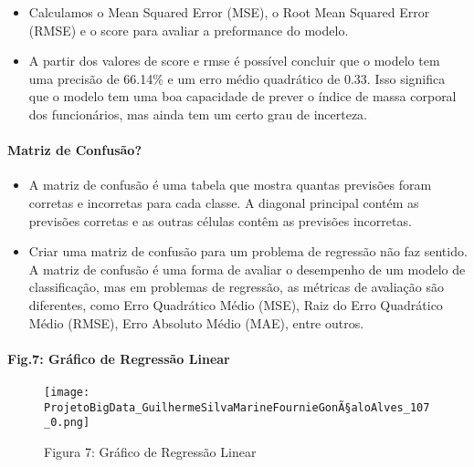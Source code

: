 \documentclass[11pt]{article}
\providecommand{\tightlist}{%
      \setlength{\itemsep}{0pt}\setlength{\parskip}{0pt}}
\begin{document}
    \begin{itemize}
\tightlist
\item
  Calculamos o Mean Squared Error (MSE), o Root Mean Squared Error
  (RMSE) e o score para avaliar a preformance do modelo.
\item
  A partir dos valores de score e rmse é possível concluir que o modelo
  tem uma precisão de 66.14\% e um erro médio quadrático de 0.33. Isso
  significa que o modelo tem uma boa capacidade de prever o índice de
  massa corporal dos funcionários, mas ainda tem um certo grau de
  incerteza.
\end{itemize}

    \hypertarget{matriz-de-confusuxe3o}{%
\paragraph{Matriz de Confusão?}\label{matriz-de-confusuxe3o}}

    \begin{itemize}
\tightlist
\item
  A matriz de confusão é uma tabela que mostra quantas previsões foram
  corretas e incorretas para cada classe. A diagonal principal contém as
  previsões corretas e as outras células contêm as previsões incorretas.
\item
  Criar uma matriz de confusão para um problema de regressão não faz
  sentido. A matriz de confusão é uma forma de avaliar o desempenho de
  um modelo de classificação, mas em problemas de regressão, as métricas
  de avaliação são diferentes, como Erro Quadrático Médio (MSE), Raiz do
  Erro Quadrático Médio (RMSE), Erro Absoluto Médio (MAE), entre outros.
\end{itemize}

    \hypertarget{gruxe1fico-de-regressuxe3o-linear}{%
\paragraph{Fig.7: Gráfico de Regressão
Linear}\label{gruxe1fico-de-regressuxe3o-linear}}

\begin{figure}[h]
   \centering
   \texttt{[image: ProjetoBigData\_GuilhermeSilvaMarineFournieGonÃ§aloAlves\_107\_0.png]}
   \pagebreak
    \caption{Figura 7: Gráfico de Regressão Linear}
    \pagebreak
   \label{fig:RegressãoLinear}
\end{figure}
\end{document}
